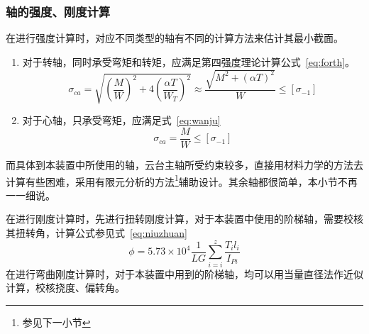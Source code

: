 \subsubsection{轴的强度、刚度计算}
    在进行强度计算时，对应不同类型的轴有不同的计算方法来估计其最小截面。
    \begin{enumerate}
        \item   对于转轴，同时承受弯矩和转矩，应满足第四强度理论计算公式~\ref{eq:forth}。
            \begin{equation}
                \label{eq:forth}
                \sigma _{ca} = \sqrt{\left( \frac{M}{W}\right)^2 + 4\left(\frac{\alpha T}{W_T}\right)^2}
                \approx 
                \frac{\sqrt{M^2 + (\alpha T)^2}}{W}
                \leq [\sigma _{-1}]
            \end{equation}
        
        \item   对于心轴，只承受弯矩，应满足式~\ref{eq:wanju}
            \begin{equation}
                \label{eq:wanju}
                \sigma _{ca} = \frac{M}{W} \leq [\sigma _{-1}]
            \end{equation}
        \end{enumerate}
        而具体到本装置中所使用的轴，云台主轴所受约束较多，直接用材料力学的方法去计算有些困难，采用有限元分析的方法\footnote{参见下一小节}辅助设计。其余轴都很简单，本小节不再一一细说。
        
        在进行刚度计算时，先进行扭转刚度计算，对于本装置中使用的阶梯轴，需要校核其扭转角，计算公式参见式~\ref{eq:niuzhuan}
        \begin{equation}
            \label{eq:niuzhuan}
            \phi = 5.73\times 10^4 \frac{1}{LG}\sum_{i=i}^{z}\frac{T_i l_i}{I_{Pi}}
        \end{equation}
        在进行弯曲刚度计算时，对于本装置中用到的阶梯轴，均可以用当量直径法\cite{MMDM}作近似计算，校核挠度、偏转角。
